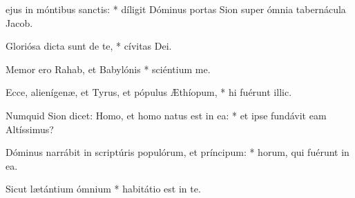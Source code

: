 \begin{psalmus}

     ejus in móntibus sanctis: * díligit Dóminus portas Sion super ómnia tabernácula Jacob.

    Gloriósa dicta sunt de te, * cívitas Dei.

    Memor ero Rahab, et Babylónis * sciéntium me.

    Ecce, alienígenæ, et Tyrus, et pópulus Æthíopum, * hi fuérunt illic.

    Numquid Sion dicet: Homo, et homo natus est in ea: * et ipse fundávit eam Altíssimus?

    Dóminus narrábit in scriptúris populórum, et príncipum: * horum, qui fuérunt in ea.

    Sicut lætántium ómnium * habitátio est in te.

\end{psalmus}

